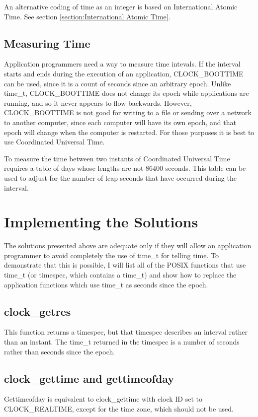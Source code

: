 \documentclass[letterpaper,twoside]{article}
\begin{document}
An alternative coding of time as an integer is based on International
Atomic Time.  See section \ref{section:International Atomic Time}.

\subsection{Measuring Time}
Application programmers need a way to measure time intevals.
If the interval starts and ends during the execution of an application,
CLOCK\_BOOTTIME
can be used, since it is a count of seconds since an arbitrary epoch.
Unlike {\ttfamily time\_t}, CLOCK\_BOOTTIME does not change its epoch while
applications are running, and so it never appears to flow
backwards.  However, CLOCK\_BOOTTIME is not good for writing to a file
or sending
over a network to another computer, since each computer will have
its own epoch, and that epoch will change when the computer is restarted.
For those purposes it is best to use Coordinated Universal Time.

To measure the time between two instants of Coordinated Universal Time
requires a table of days whose lengths are not \num{86400} seconds.
This table
can be used to adjust for the number of leap seconds that have occurred
during the interval.

\section{Implementing the Solutions}
The solutions presented above are adequate only if they will allow an
application
programmer to avoid completely the use of {\ttfamily time\_t} for telling time.
To demonstrate that this is possible,
I will list all of the POSIX functions 
that use {\ttfamily time\_t}
(or timespec, which contains a {\ttfamily time\_t}) 
and show how to
replace the application functions which use {\ttfamily time\_t} as
seconds since the epoch.

\subsection{clock\_getres}
This function returns a timespec, but that timespec describes an interval
rather than an instant.  The {\ttfamily time\_t} returned in the timespec is a
number of seconds rather than seconds since the epoch.

\subsection{clock\_gettime and gettimeofday}
Gettimeofday is equivalent to clock\_gettime with clock ID set to
CLOCK\_REAL\-TIME, except for the time zone, which should not be used.
\end{document}

